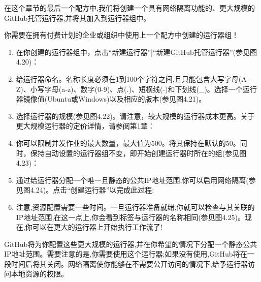 在这个章节的最后一个配方中,我们将创建一个具有网络隔离功能的、更大规模的GitHub托管运行器,并将其加入到运行器组中。


你需要在拥有付费计划的企业或组织中使用上一个配方中创建的运行器组！


\begin{enumerate}
\item 
在你创建的运行器组中，点击“新建运行器”|“新建GitHub托管运行器”(参见图4.20)：


\item 
给运行器命名。名称长度必须在1到100个字符之间,且只能包含大写字母(A-Z)、小写字母(a-z)、数字(0-9)、点(.)、短横线(-)和下划线(\_)。选择一个运行器镜像值(Ubuntu或Windows)以及相应的版本(参见图4.21)。


\item 
选择运行器的规模(参见图4.22)。请注意，较大规模的运行器成本更高。关于更大规模运行器的定价详情，请参阅第1章：


\item 
你可以限制并发作业的最大数量，最大值为500。将其保持在默认的50。同时，保持自动设置的运行器组不变，即开始创建运行器时所在的组(参见图4.23)：


\item 
通过给运行器分配一个唯一且静态的公共IP地址范围,你可以启用网络隔离(参见图4.24)。点击“创建运行器”以完成此过程:


\item 
注意,资源配置需要一些时间。一旦运行器准备就绪,你就可以检查与其关联的IP地址范围,在这一点上,你会看到标签与运行器的名称相同(参见图4.25)。现在,你可以在更大的运行器上开始执行工作流了!


\end{enumerate}


GitHub将为你配置这些更大规模的运行器,并在你希望的情况下分配一个静态公共IP地址范围。需要注意的是,你需要使用这个运行器;如果没有使用,GitHub将在一段时间后将其关闭。网络隔离使你能够在不需要公开访问的情况下,给予运行器访问本地资源的权限。